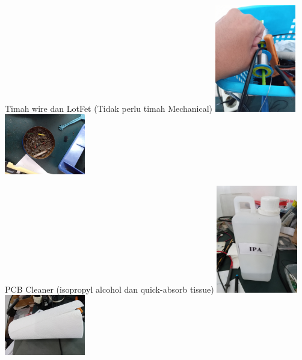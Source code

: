 \documentclass[table,dvipsnames]{beamer}
\begin{document}
	\begin{frame}
		\begin{exampleblock}{Timah wire dan LotFet (Tidak perlu timah Mechanical)}
			\centering
			\includegraphics[width=100pt,angle=-90,origin=c]{images/timah}
			\includegraphics[width=100pt,angle=-90,origin=c]{images/lotfet}
		\end{exampleblock}
		
		\begin{exampleblock}{PCB Cleaner (isopropyl alcohol dan quick-absorb tissue)}
			\centering
			\includegraphics[width=100pt,angle=-90,origin=c]{images/pcbclean0}
			\includegraphics[width=100pt,angle=-90,origin=c]{images/pcbclean1}
		\end{exampleblock}
	\end{frame}
\end{document}
